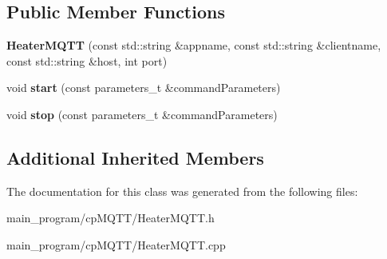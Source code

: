 \subsection*{Public Member Functions}
\begin{DoxyCompactItemize}
\item 
{\bfseries Heater\+M\+Q\+TT} (const std\+::string \&appname, const std\+::string \&clientname, const std\+::string \&host, int port)\hypertarget{class_heater_m_q_t_t_aab2a6e6a1e3eae626e867ff671b71a0e}{}\label{class_heater_m_q_t_t_aab2a6e6a1e3eae626e867ff671b71a0e}

\item 
void {\bfseries start} (const parameters\+\_\+t \&command\+Parameters)\hypertarget{class_heater_m_q_t_t_a9903c8c0e1c4a5cd26cd75c484a4f4a6}{}\label{class_heater_m_q_t_t_a9903c8c0e1c4a5cd26cd75c484a4f4a6}

\item 
void {\bfseries stop} (const parameters\+\_\+t \&command\+Parameters)\hypertarget{class_heater_m_q_t_t_a90248f98e4548768bd65b5aff38fafee}{}\label{class_heater_m_q_t_t_a90248f98e4548768bd65b5aff38fafee}

\end{DoxyCompactItemize}
\subsection*{Additional Inherited Members}


The documentation for this class was generated from the following files\+:\begin{DoxyCompactItemize}
\item 
main\+\_\+program/cp\+M\+Q\+T\+T/Heater\+M\+Q\+T\+T.\+h\item 
main\+\_\+program/cp\+M\+Q\+T\+T/Heater\+M\+Q\+T\+T.\+cpp\end{DoxyCompactItemize}
